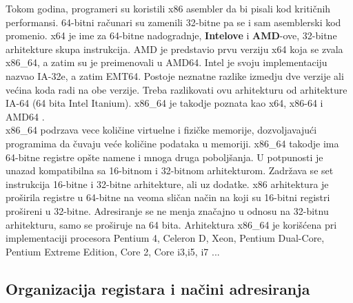 \documentclass[a4paper]{article}
\begin{document}
Tokom godina, programeri su koristili x86 asembler da bi pisali kod kriti\v cnih performansi. 64-bitni ra\v cunari su 
zamenili 32-bitne pa se i sam asemblerski kod promenio. x64 je ime za 64-bitne nadogradnje, \textbf{Intelove} i \textbf{AMD}-ove, 32-bitne arhitekture
skupa instrukcija. AMD je predstavio prvu verziju x64 koja se zvala x86\_64, a zatim su je preimenovali u AMD64. 
Intel je svoju implementaciju nazvao IA-32e, a zatim EMT64. Postoje neznatne razlike izmedju dve verzije ali ve\' cina koda 
radi na obe verzije. Treba razlikovati ovu arhitekturu od arhitekture IA-64 (64 bita Intel Itanium). x86\_64 je takodje
poznata kao x64, x86-64 i AMD64 \cite{Wikipedia}.\\
x86\_64 podrzava vece koli\v cine virtuelne i fizi\v cke memorije, dozvoljavaju\' ci programima da \v cuvaju ve\' ce
koli\v cine podataka u memoriji. x86\_64 takodje ima 64-bitne registre op\v ste namene i mnoga druga pobolj\v sanja.
U potpunosti je unazad kompatibilna sa 16-bitnom i 32-bitnom arhitekturom. Zadr\v zava se set instrukcija 16-bitne i 
32-bitne arhitekture, ali uz dodatke. x86 arhitektura je pro\v sirila registre u 64-bitne na veoma sli\v can na\v cin 
na koji su 16-bitni registri pro\v sireni u 32-bitne. Adresiranje se ne menja zna\v cajno u odnosu na 32-bitnu arhitekturu,
samo se pro\v siruje na 64 bita. Arhitektura x86\_64 je kori\v s\' cena pri implementaciji procesora Pentium 4,
Celeron D, Xeon, Pentium Dual-Core, Pentium Extreme Edition, Core 2, Core i3,i5, i7 \cite{Wikipedia}...

\subsection{\textbf{Organizacija registara i na\v cini adresiranja}}
\end{document}

